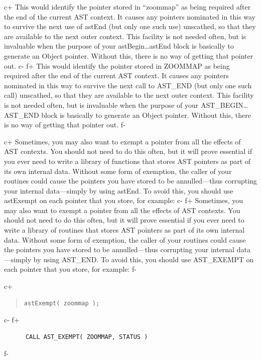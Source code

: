 \documentclass[twoside,11pt]{article}
\begin{document}
c+
This would identify the pointer stored in ``zoommap'' as being required
after the end of the current AST context. It causes any pointers
nominated in this way to survive the next use of astEnd (but only one
such use) unscathed, so that they are available to the next outer
context.  This facility is not needed often, but is invaluable when
the purpose of your astBegin\ldots astEnd block is basically to
generate an Object pointer. Without this, there is no way of getting
that pointer out.
c-
f+
This would identify the pointer stored in ZOOMMAP as being required after
the end of the current AST context. It causes any pointers nominated
in this way to survive the next call to AST\_END (but only one such
call) unscathed, so that they are available to the next outer context.
This facility is not needed often, but is invaluable when the purpose
of your AST\_BEGIN\ldots AST\_END block is basically to generate an
Object pointer. Without this, there is no way of getting that pointer
out.
f-

c+
Sometimes, you may also want to exempt a pointer from all the effects
of AST contexts. You should not need to do this often, but it will
prove essential if you ever need to write a library of functions that
stores AST pointers as part of its own internal data. Without some
form of exemption, the caller of your routines could cause the
pointers you have stored to be annulled---thus corrupting your
internal data---simply by using astEnd. To avoid this, you should use
astExempt on each pointer that you store, for example:
c-
f+
Sometimes, you may also want to exempt a pointer from all the effects
of AST contexts. You should not need to do this often, but it will
prove essential if you ever need to write a library of routines that
stores AST pointers as part of its own internal data. Without some
form of exemption, the caller of your routines could cause the
pointers you have stored to be annulled---thus corrupting your
internal data---simply by using AST\_END. To avoid this, you should
use AST\_EXEMPT on each pointer that you store, for example:
f-

c+
\begin{quote}
\small
\begin{verbatim}
astExempt( zoommap );
\end{verbatim}
\normalsize
\end{quote}
c-
f+
\small
\begin{verbatim}
      CALL AST_EXEMPT( ZOOMMAP, STATUS )
\end{verbatim}
\normalsize
f-
\end{document}
